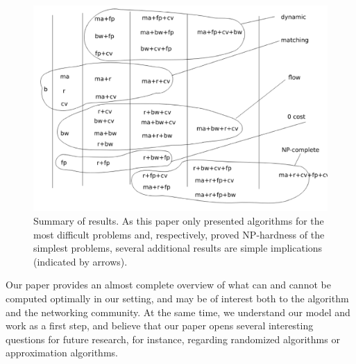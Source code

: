 \documentclass[9pt,twocolumn]{scrartcl}
\begin{document}
\begin{figure}[t]
\includegraphics[width = \columnwidth]{figs/summary}
\caption{Summary of results. As this paper only presented algorithms for the most
difficult problems and, respectively, proved NP-hardness of the simplest
problems, several additional results are simple implications (indicated by arrows).}
\label{fig:summary}
\end{figure}


Our paper provides an almost complete overview of what can and cannot be
computed optimally in our setting, and may be of interest both to the algorithm
and the networking community. At the same time, we understand our model and work
as a first step, and believe that our paper opens several interesting
questions for future research, for instance, regarding randomized algorithms
or approximation algorithms.


%


\end{document}
